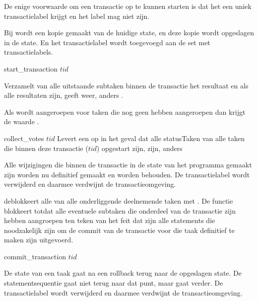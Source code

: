 De enige voorwaarde om een transactie op te kunnen starten is dat het een uniek transactielabel krijgt en het label mag
niet  zijn.

Bij  wordt een kopie gemaakt van de huidige state, en deze kopie wordt opgeslagen in de state. En
het transactielabel wordt toegevoegd aan de set met transactielabels.

\begin{functie}{start_transaction $tid$}
\end{functie}

Verzamelt van alle uitstaande subtaken binnen de transactie het resultaat en als alle resultaten
 zijn, geeft   weer, anders .

Als  wordt aangeroepen voor taken die nog geen  hebben aangeroepen dan krijgt
 de waarde .

\begin{functie}{collect_votes $tid$}
	\functieresultaat{} Levert een  op in het geval dat alle statusTaken van alle
	taken die binnen deze transactie (\(tid\)) opgestart zijn,  zijn,  anders
\end{functie}

Alle wijzigingen die binnen de transactie in de state van het programma gemaakt zijn
worden nu definitief gemaakt en worden behouden. De transactielabel wordt verwijderd en daarmee verdwijnt de
transactieomgeving.

 deblokkeert alle  van alle onderliggende deelnemende taken met
. De functie blokkeert totdat alle eventuele subtaken die onderdeel van de transactie zijn
 hebben aangroepen ten teken van het feit dat zijn alle statements die noodzakelijk zijn
om de commit van de transactie voor die taak definitief te maken zijn uitgevoerd.

\begin{functie}{commit_transaction $tid$}
\end{functie}

De state van een taak gaat na een rollback terug naar de opgeslagen state. De statementsequentie gaat niet terug naar
dat punt, maar gaat verder. De transactielabel wordt verwijderd en daarmee verdwijnt de transactieomgeving.

